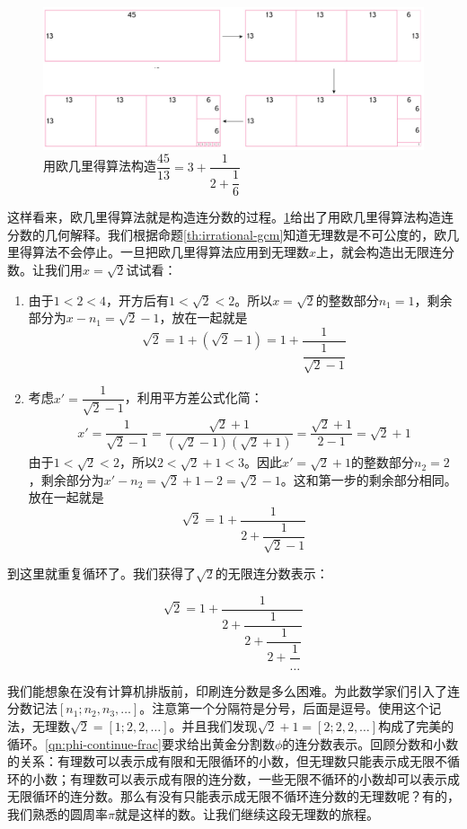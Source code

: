 \documentclass[b5paper]{ctexart}
\begin{document}
\begin{figure}[htbp]
 \centering
 \includegraphics[scale=0.5]{img/cont-frac}
 \caption{用欧几里得算法构造$\dfrac{45}{13} = 3 + \dfrac{1}{2 + \dfrac{1}{6}}$}
 \label{fig:cont-frac}
\end{figure}

这样看来，欧几里得算法就是构造连分数的过程。\cref{fig:cont-frac}给出了用欧几里得算法构造连分数的几何解释。我们根据命题\ref{th:irrational-gcm}知道无理数是不可公度的，欧几里得算法不会停止。一旦把欧几里得算法应用到无理数$x$上，就会构造出无限连分数。让我们用$x = \sqrt{2}$试试看：

\begin{enumerate}[第1步，]
\item 由于$1 < 2 < 4$，开方后有$1 < \sqrt{2} < 2$。所以$x = \sqrt{2}$的整数部分$n_1 = 1$，剩余部分为$x - n_1 = \sqrt{2} - 1$，放在一起就是
\[
 \sqrt{2} = 1 + (\sqrt{2} - 1) = 1 + \dfrac{1}{\dfrac{1}{\sqrt{2} - 1}}
\]
\item 考虑$x' = \dfrac{1}{\sqrt{2} - 1}$，利用平方差公式化简：
  \begin{align*}
    x' = \dfrac{1}{\sqrt{2} - 1} = \dfrac{\sqrt{2} + 1}{(\sqrt{2} - 1)(\sqrt{2} + 1)} = \dfrac{\sqrt{2} + 1}{2 - 1} = \sqrt{2} + 1
  \end{align*}
  由于$1 < \sqrt{2} < 2$，所以$2 < \sqrt{2} + 1 < 3$。因此$x' = \sqrt{2} + 1$的整数部分$n_2 = 2$，剩余部分为$x' - n_2 = \sqrt{2} + 1 - 2 = \sqrt{2} - 1$。这和第一步的剩余部分相同。放在一起就是
\[
 \sqrt{2} = 1 + \dfrac{1}{2 + \dfrac{1}{\sqrt{2} - 1}}
\]
\end{enumerate}
到这里就重复循环了。我们获得了$\sqrt{2}$的无限连分数表示：

\[
 \sqrt{2} = 1 + \dfrac{1}{2 + \dfrac{1}{2 + \dfrac{1}{2 + \dfrac{1}{\dotso}}}}
\]

我们能想象在没有计算机排版前，印刷连分数是多么困难。为此数学家们引入了连分数记法$[n_1; n_2, n_3, \dotso]$。注意第一个分隔符是分号，后面是逗号。使用这个记法，无理数$\sqrt{2} = [1; 2, 2, \dotso]$。并且我们发现$\sqrt{2} + 1 = [2; 2, 2, \dotso]$构成了完美的循环。\cref{qn:phi-continue-frac}要求给出黄金分割数$\phi$的连分数表示。回顾分数和小数的关系：有理数可以表示成有限和无限循环的小数，但无理数只能表示成无限不循环的小数；有理数可以表示成有限的连分数，一些无限不循环的小数却可以表示成无限循环的连分数。那么有没有只能表示成无限不循环连分数的无理数呢？有的，我们熟悉的圆周率$\pi$就是这样的数。让我们继续这段无理数的旅程。
\end{document}
